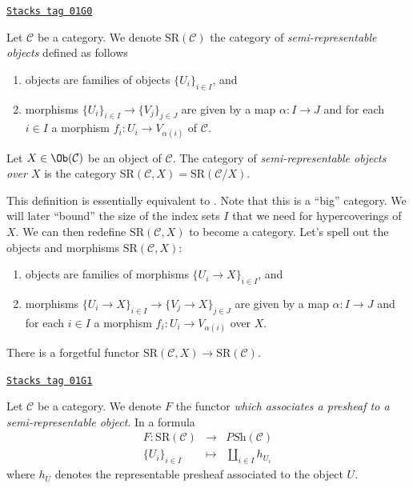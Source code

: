 \begin{definition}[SR]
\label{hypercovering-definition-SR}
\href{https://stacks.math.columbia.edu/tag/01G0}{\texttt{Stacks tag 01G0}}

Let $\mathcal{C}$ be a category. We denote $\text{SR}(\mathcal{C})$
the category of {\it semi-representable objects} defined as follows
\begin{enumerate}
\item objects are families of objects $\{U_i\}_{i \in I}$, and
\item morphisms $\{U_i\}_{i \in I} \to \{V_j\}_{j \in J}$ are given by
a map $\alpha : I \to J$ and for each $i \in I$
a morphism $f_i : U_i \to V_{\alpha(i)}$ of $\mathcal{C}$.
\end{enumerate}
Let $X \in \Ob(\mathcal{C})$ be an object of $\mathcal{C}$.
The category of {\it semi-representable objects over $X$}
is the category
$\text{SR}(\mathcal{C}, X) = \text{SR}(\mathcal{C}/X)$.
\end{definition}

This definition is essentially equivalent to
\cite[Expos\'e V, Subsection 7.3.0]{SGA4}. Note that
this is a ``big'' category. We will later ``bound'' the size of the index
sets $I$ that we need for hypercoverings of $X$. We can then redefine
$\text{SR}(\mathcal{C}, X)$ to become a category. Let's spell out
the objects and morphisms $\text{SR}(\mathcal{C}, X)$:
\begin{enumerate}
\item objects are families of morphisms
$\{U_i \to X\}_{i \in I}$, and
\item morphisms $\{U_i \to X\}_{i \in I} \to
\{V_j \to X\}_{j \in J}$ are given by
a map $\alpha : I \to J$ and for each $i \in I$
a morphism $f_i : U_i \to V_{\alpha(i)}$ over $X$.
\end{enumerate}
There is a forgetful functor
$\text{SR}(\mathcal{C}, X) \to \text{SR}(\mathcal{C})$.

\begin{definition}[SR F]
\label{hypercovering-definition-SR-F}
\href{https://stacks.math.columbia.edu/tag/01G1}{\texttt{Stacks tag 01G1}}

Let $\mathcal{C}$ be a category.
We denote $F$ the functor {\it which associates a presheaf to a
semi-representable object}. In a formula
\begin{eqnarray*}
F : \text{SR}(\mathcal{C}) & \longrightarrow & \textit{PSh}(\mathcal{C}) \\
\{U_i\}_{i \in I} & \longmapsto & \amalg_{i\in I} h_{U_i}
\end{eqnarray*}
where $h_U$ denotes the representable presheaf associated to
the object $U$.
\end{definition}

